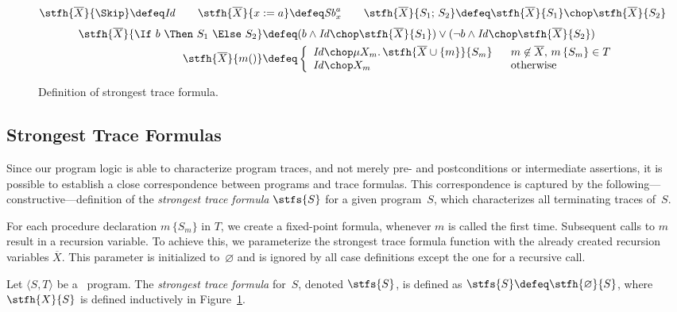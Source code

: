 \documentclass[a4paper,numberwithinsect]{lipics-v2021}
\begin{document}

\begin{figure}%
  \centering
    $\stfh{\overline{X}}{\Skip}  \defeq \mathit{Id} \qquad
    \stfh{\overline{X}}{x := a}  \defeq \mathit{Sb}^{a}_x \qquad
    \stfh{\overline{X}}{S_1;\,S_2}  \defeq \stfh{\overline{X}}{S_1} \chop \stfh{\overline{X}}{S_2}
    $
    \begin{align*}
    \stfh{\overline{X}}{\If\ b\ \Then\ S_1\ \Else\ S_2} & \defeq 
       (b \land \mathit{Id} \chop \stfh{\overline{X}}{S_1})
       \lor
       (\lnot b \land \mathit{Id} \chop \stfh{\overline{X}}{S_2}) \\
  \stfh{\overline{X}}{m()} & \defeq 
  \left\{
    \begin{array}{l@{\quad}l}
    \mathit{Id} \chop \mu X_m.\, \stfh{\overline{X}\cup\{m\}}{S_m} & 
    ~~m\not\in\overline{X},\,m\,\{{S_m}\}\in T \\
    \mathit{Id} \chop X_m & ~~\text{otherwise}
    \end{array}
          \right.
  \end{align*}
\caption{\label{fig:stf}Definition of strongest trace formula.}
\end{figure}


\subsection{Strongest Trace Formulas} 
\label{sec:stf}

Since our program logic is able to characterize program traces, and not
merely pre- and postconditions or intermediate assertions, it is
possible to establish a close correspondence between programs and
trace formulas.
%
This correspondence is captured by the
following---constructive---definition of the \emph{strongest trace
formula} $\stfs{S}$ for a given program~$S$, which characterizes all
terminating traces of~$S$.

For each procedure declaration $m\,\{S_m\}$ in $T$, we create a
fixed-point formula, whenever $m$ is called the first time. Subsequent
calls to $m$ result in a recursion variable. To achieve this, we
parameterize the strongest trace formula function with the already
created recursion variables $\overline{X}$. This parameter is
initialized to~$\varnothing$ and is ignored by all case definitions
except the one for a recursive call.

\begin{definition}
\label{def:stf}
  Let $\langle S,T\rangle$ be a \Rec\ program.
  The \emph{strongest trace formula} for~$S$, denoted
  $\stfs{S}$, is defined as $\stfs{S}\defeq\stfh{\varnothing}{S}$, where
  $\stfh{X}{S}$ is defined inductively in Figure~\ref{fig:stf}.
\end{definition}
\end{document}
